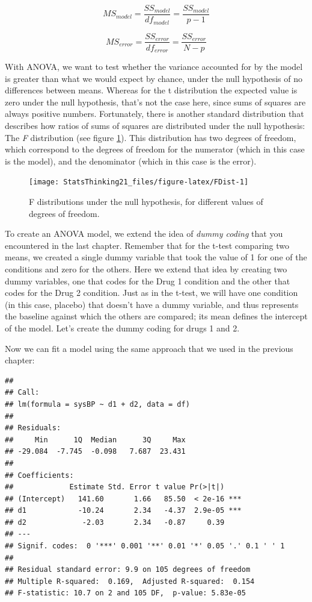 \documentclass[12pt,]{book}
\theoremstyle{definition}
\theoremstyle{definition}
\theoremstyle{definition}
\theoremstyle{remark}
\begin{document}
\[
MS_{model} =\frac{SS_{model}}{df_{model}}= \frac{SS_{model}}{p-1}
\]

\[
MS_{error} = \frac{SS_{error}}{df_{error}} = \frac{SS_{error}}{N - p}
\]

With ANOVA, we want to test whether the variance accounted for by the model is greater than what we would expect by chance, under the null hypothesis of no differences between means. Whereas for the t distribution the expected value is zero under the null hypothesis, that's not the case here, since sums of squares are always positive numbers. Fortunately, there is another standard distribution that describes how ratios of sums of squares are distributed under the null hypothesis: The \emph{F} distribution (see figure \ref{fig:FDist}). This distribution has two degrees of freedom, which correspond to the degrees of freedom for the numerator (which in this case is the model), and the denominator (which in this case is the error).

\begin{figure}
\texttt{[image: StatsThinking21\_files/figure-latex/FDist-1]} \caption{F distributions under the null hypothesis, for different values of degrees of freedom.}\label{fig:FDist}
\end{figure}

To create an ANOVA model, we extend the idea of \emph{dummy coding} that you encountered in the last chapter. Remember that for the t-test comparing two means, we created a single dummy variable that took the value of 1 for one of the conditions and zero for the others. Here we extend that idea by creating two dummy variables, one that codes for the Drug 1 condition and the other that codes for the Drug 2 condition. Just as in the t-test, we will have one condition (in this case, placebo) that doesn't have a dummy variable, and thus represents the baseline against which the others are compared; its mean defines the intercept of the model. Let's create the dummy coding for drugs 1 and 2.

Now we can fit a model using the same approach that we used in the previous chapter:

\begin{verbatim}
## 
## Call:
## lm(formula = sysBP ~ d1 + d2, data = df)
## 
## Residuals:
##     Min      1Q  Median      3Q     Max 
## -29.084  -7.745  -0.098   7.687  23.431 
## 
## Coefficients:
##             Estimate Std. Error t value Pr(>|t|)    
## (Intercept)   141.60       1.66   85.50  < 2e-16 ***
## d1            -10.24       2.34   -4.37  2.9e-05 ***
## d2             -2.03       2.34   -0.87     0.39    
## ---
## Signif. codes:  0 '***' 0.001 '**' 0.01 '*' 0.05 '.' 0.1 ' ' 1
## 
## Residual standard error: 9.9 on 105 degrees of freedom
## Multiple R-squared:  0.169,  Adjusted R-squared:  0.154 
## F-statistic: 10.7 on 2 and 105 DF,  p-value: 5.83e-05
\end{verbatim}
\end{document}
